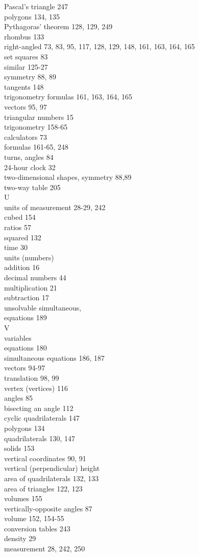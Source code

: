 \documentclass[10pt]{article}
\begin{document}
Pascal's triangle 247\\
polygons 134, 135\\
Pythagoras' theorem 128, 129, 249\\
rhombus 133\\
right-angled 73, 83, 95, 117, 128, 129, 148, 161, 163, 164, 165\\
set squares 83\\
similar 125-27\\
symmetry 88, 89\\
tangents 148\\
trigonometry formulas 161, 163, 164, 165\\
vectors 95, 97\\
triangular numbers 15\\
trigonometry 158-65\\
calculators 73\\
formulas 161-65, 248\\
turns, angles 84\\
24-hour clock 32\\
two-dimensional shapes, symmetry 88,89\\
two-way table 205\\
U\\
units of measurement 28-29, 242\\
cubed 154\\
ratios 57\\
squared 132\\
time 30\\
units (numbers)\\
addition 16\\
decimal numbers 44\\
multiplication 21\\
subtraction 17\\
unsolvable simultaneous,\\
equations 189\\
V\\
variables\\
equations 180\\
simultaneous equations 186, 187\\
vectors 94-97\\
translation 98, 99\\
vertex (vertices) 116\\
angles 85\\
bisecting an angle 112\\
cyclic quadrilaterals 147\\
polygons 134\\
quadrilaterals 130, 147\\
solids 153\\
vertical coordinates 90, 91\\
vertical (perpendicular) height\\
area of quadrilaterals 132, 133\\
area of triangles 122, 123\\
volumes 155\\
vertically-opposite angles 87\\
volume 152, 154-55\\
conversion tables 243\\
density 29\\
measurement 28, 242, 250
\end{document}
